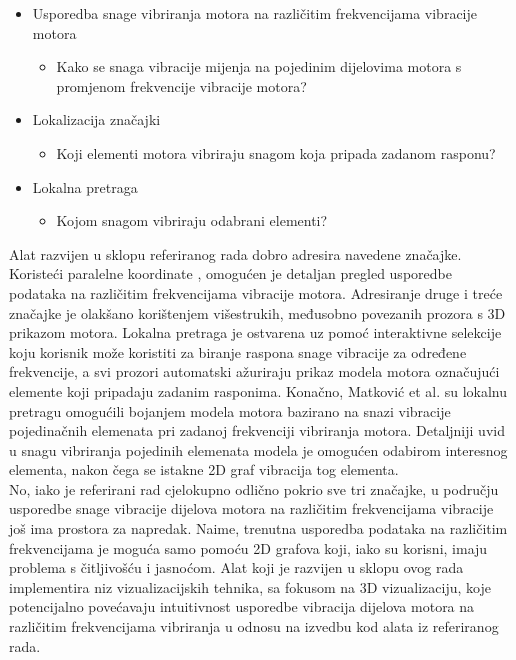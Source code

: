 \documentclass[times, utf8, diplomski]{fer}
\begin{document}
\begin{itemize}
\item Usporedba snage vibriranja motora na različitim frekvencijama vibracije motora
	\begin{itemize}
	\item Kako se snaga vibracije mijenja na pojedinim dijelovima motora s promjenom frekvencije vibracije motora?
	\end{itemize} 
\item Lokalizacija značajki
	\begin{itemize}
	\item Koji elementi motora vibriraju snagom koja pripada zadanom rasponu?
	\end{itemize} 
\item Lokalna pretraga
	\begin{itemize}
	\item Kojom snagom vibriraju odabrani elementi?\\
	\end{itemize} 
\end{itemize}

Alat razvijen u sklopu referiranog rada dobro adresira navedene značajke. Koristeći paralelne koordinate \citep{inselberg1990}, omogućen je detaljan pregled usporedbe podataka na različitim frekvencijama vibracije motora. Adresiranje druge i treće značajke je olakšano korištenjem višestrukih, međusobno povezanih prozora s 3D prikazom motora. Lokalna pretraga je ostvarena uz pomoć interaktivne selekcije koju korisnik može koristiti za biranje raspona snage vibracije za određene frekvencije, a svi prozori automatski ažuriraju prikaz modela motora označujući elemente koji pripadaju zadanim rasponima. Konačno, Matković et al. \citep{matkovic2021getting} su lokalnu pretragu omogućili bojanjem modela motora bazirano na snazi vibracije pojedinačnih elemenata pri zadanoj frekvenciji vibriranja motora. Detaljniji uvid u snagu vibriranja pojedinih elemenata modela je omogućen odabirom interesnog elementa, nakon čega se istakne 2D graf vibracija tog elementa.\\

No, iako je referirani rad cjelokupno odlično pokrio sve tri značajke, u području usporedbe snage vibracije dijelova motora na različitim frekvencijama vibracije još ima prostora za napredak. Naime, trenutna usporedba podataka na različitim frekvencijama je moguća samo pomoću 2D grafova koji, iako su korisni, imaju problema s čitljivošću i jasnoćom. Alat koji je razvijen u sklopu ovog rada implementira niz vizualizacijskih tehnika, sa fokusom na 3D vizualizaciju, koje potencijalno povećavaju intuitivnost usporedbe vibracija dijelova motora na različitim frekvencijama vibriranja u odnosu na izvedbu kod alata iz referiranog rada.
\end{document}
